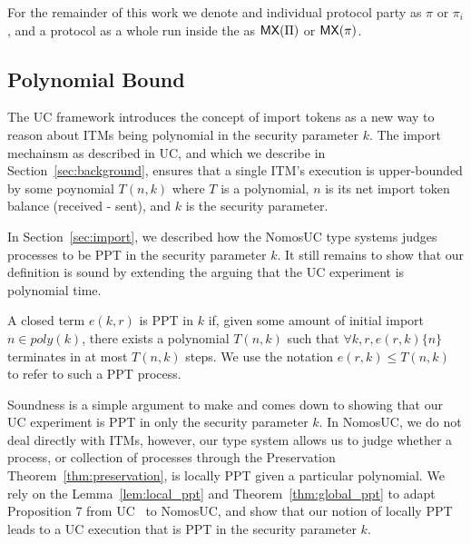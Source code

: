 For the remainder of this work we denote and individual protocol party as $\pi$ or $\pi_i$, and a protocol as a whole run inside the \partywrapper as $\mathsf{MX}(\Pi)$ or $\mathsf{MX}(\pi)$.

\subsection{Polynomial Bound}
The UC framework introduces the concept of import tokens as a new way to reason about ITMs being polynomial in the security parameter $k$. 
The import mechainsm as described in UC, and which we describe in Section~\ref{sec:background}, ensures that a single ITM's execution is upper-bounded by some poynomial $T(n,k)$ where $T$ is a polynomial, $n$ is its net import token balance (received - sent), and $k$ is the security parameter.

In Section~\ref{sec:import}, we described how the NomosUC type systems judges processes to be PPT in the security parameter $k$. 
It still remains to show that our definition is sound by extending the arguing that the UC experiment  is polynomial time.
\begin{ddef}[PPT in $k$]\label{def:ppt}
A closed term $e(k,r)$ is  PPT in $k$ if, given some amount of initial import $n \in poly(k)$, there exists a polynomial $T(n,k)$ such that $\forall k, r, e(r,k) \{n\}$ terminates in at most $T(n,k)$ steps.
We use the notation $e(r,k) \leq T(n,k)$ to refer to such a PPT process.
\end{ddef}

Soundness is a simple argument to make and comes down to showing that our UC experiment is PPT in only the security parameter $k$. 
In NomosUC, we do not deal directly with ITMs, however, our type system allows us to judge whether a process, or collection of processes through the Preservation Theorem~\ref{thm:preservation}, is locally PPT given a particular polynomial. 
We rely on the Lemma~\ref{lem:local_ppt} and Theorem~\ref{thm:global_ppt} to adapt Proposition 7 from UC~\cite{canettiUC} to NomosUC, and show that our notion of locally PPT leads to a UC execution that is PPT in the security parameter $k$.

